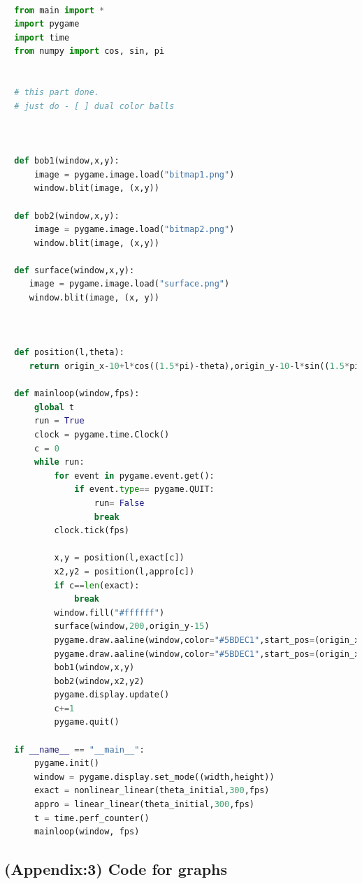 \documentclass[11pt,a4paper]{article}
\begin{document}
\begin{lstlisting}[language=Python]

  from main import *
  import pygame
  import time
  from numpy import cos, sin, pi


  # this part done.
  # just do - [ ] dual color balls



  def bob1(window,x,y):
      image = pygame.image.load("bitmap1.png")
      window.blit(image, (x,y))

  def bob2(window,x,y):
      image = pygame.image.load("bitmap2.png")
      window.blit(image, (x,y))

  def surface(window,x,y):
     image = pygame.image.load("surface.png")
     window.blit(image, (x, y))



  def position(l,theta):
     return origin_x-10+l*cos((1.5*pi)-theta),origin_y-10-l*sin((1.5*pi)-theta)

  def mainloop(window,fps):
      global t
      run = True
      clock = pygame.time.Clock()
      c = 0
      while run:
          for event in pygame.event.get():
              if event.type== pygame.QUIT:
                  run= False
                  break
          clock.tick(fps)

          x,y = position(l,exact[c])
          x2,y2 = position(l,appro[c])
          if c==len(exact):
              break
          window.fill("#ffffff")
          surface(window,200,origin_y-15)
          pygame.draw.aaline(window,color="#5BDEC1",start_pos=(origin_x,origin_y),end_pos=(x+radius,y+radius))
          pygame.draw.aaline(window,color="#5BDEC1",start_pos=(origin_x,origin_y),end_pos=(x2+10,y2+10))
          bob1(window,x,y)
          bob2(window,x2,y2)
          pygame.display.update()
          c+=1
          pygame.quit()

  if __name__ == "__main__":
      pygame.init()
      window = pygame.display.set_mode((width,height))
      exact = nonlinear_linear(theta_initial,300,fps)
      appro = linear_linear(theta_initial,300,fps)
      t = time.perf_counter()
      mainloop(window, fps)


\end{lstlisting}

\subsection{(Appendix:3) Code for graphs}
\label{sec:org7d1fb23}
\end{document}

